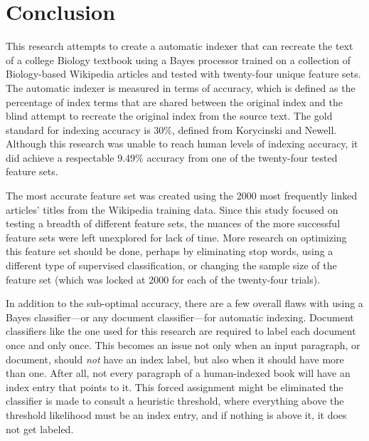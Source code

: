 \section{Conclusion}

This research attempts to create a automatic indexer that can recreate the text of a college Biology textbook using a \naive Bayes processor trained on a collection of Biology-based Wikipedia articles and tested with twenty-four unique feature sets.
The automatic indexer is measured in terms of accuracy, which is defined as the percentage of index terms that are shared between the original index and the blind attempt to recreate the original index from the source text.
The gold standard for indexing accuracy is 30\%, defined from Korycinski and Newell\cite{automatic-indexing}.
Although this research was unable to reach human levels of indexing accuracy, it did achieve a respectable 9.49\% accuracy from one of the twenty-four tested feature sets.

The most accurate feature set was created using the 2000 most frequently linked articles' titles from the Wikipedia training data.
Since this study focused on testing a breadth of different feature sets, the nuances of the more successful feature sets were left unexplored for lack of time.
More research on optimizing this feature set should be done, perhaps by eliminating stop words, using a different type of supervised classification, or changing the sample size of the feature set (which was locked at 2000 for each of the twenty-four trials).

In addition to the sub-optimal accuracy, there are a few overall flaws with using a \naive Bayes classifier---or any document classifier---for automatic indexing.
Document classifiers like the one used for this research are required to label each document once and only once.
This becomes an issue not only when an input paragraph, or document, should {\it not} have an index label, but also when it should have more than one.
After all, not every paragraph of a human-indexed book will have an index entry that points to it.
This forced assignment might be eliminated the classifier is made to consult a heuristic threshold, where everything above the threshold likelihood must be an index entry, and if nothing is above it, it does not get labeled.

